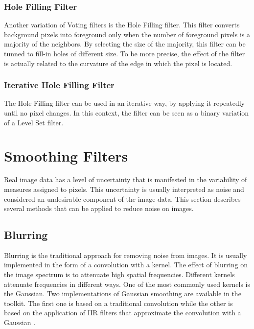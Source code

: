 \subsubsection{Hole Filling Filter}

Another variation of Voting filters is the Hole Filling filter. This filter
converts background pixels into foreground only when the number of foreground
pixels is a majority of the neighbors. By selecting the size of the majority,
this filter can be tunned to fill-in holes of different size. To be more
precise, the effect of the filter is actually related to the curvature of the
edge in which the pixel is located.

\ifitkFullVersion

\fi


\subsubsection{Iterative Hole Filling Filter}

The Hole Filling filter can be used in an iterative way, by applying it
repeatedly until no pixel changes. In this context, the filter can be seen as a
binary variation of a Level Set filter.

\ifitkFullVersion

\fi

\section{Smoothing Filters}
\label{sec:SmoothingFilters}

Real image data has a level of uncertainty that is manifested in the
variability of measures assigned to pixels. This uncertainty is usually
interpreted as noise and considered an undesirable component of the image
data. This section describes several methods that can be applied to reduce
noise on images.

\subsection{Blurring}
\label{sec:BlurringFilters}

Blurring is the traditional approach for removing noise from images. It is
usually implemented in the form of a convolution with a kernel. The effect of
blurring on the image spectrum is to attenuate high spatial
frequencies.  Different kernels attenuate frequencies in different ways. One
of the most commonly used kernels is the Gaussian. Two implementations of
Gaussian smoothing are available in the toolkit. The first one is based on a
traditional convolution while the other is based on the application of IIR
filters that approximate the convolution with a Gaussian
\cite{Deriche1990,Deriche1993}.

